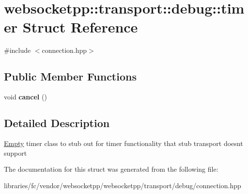 \hypertarget{structwebsocketpp_1_1transport_1_1debug_1_1timer}{}\section{websocketpp\+:\+:transport\+:\+:debug\+:\+:timer Struct Reference}
\label{structwebsocketpp_1_1transport_1_1debug_1_1timer}


{\ttfamily \#include $<$connection.\+hpp$>$}

\subsection*{Public Member Functions}
\begin{DoxyCompactItemize}
\item 
\mbox{\label{structwebsocketpp_1_1transport_1_1debug_1_1timer_a09a9366c12bd79dc2496a07794e3f17e}} 
void {\bfseries cancel} ()
\end{DoxyCompactItemize}


\subsection{Detailed Description}
\mbox{\hyperlink{class_empty}{Empty}} timer class to stub out for timer functionality that stub transport doesn\textquotesingle{}t support 

The documentation for this struct was generated from the following file\+:\begin{DoxyCompactItemize}
\item 
libraries/fc/vendor/websocketpp/websocketpp/transport/debug/connection.\+hpp\end{DoxyCompactItemize}
